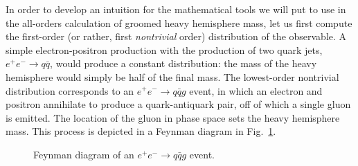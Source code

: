 \documentclass[../thesis.tex]{subfiles}
\begin{document}
	In order to develop an intuition for the mathematical tools we will put to use in the all-orders calculation of groomed heavy hemisphere mass, let us first compute the first-order (or rather, first \textit{nontrivial} order) distribution of the observable. A simple electron-positron production with the production of two quark jets, $e^+ e^- \to q\bar q$, would produce a constant distribution: the mass of the heavy hemisphere would simply be half of the final mass. The lowest-order nontrivial distribution corresponds to an $e^+ e^- \to q\bar q g$ event, in which an electron and positron annihilate to produce a quark-antiquark pair, off of which a single gluon is emitted. The location of the gluon in phase space sets the heavy hemisphere mass. This process is depicted in a Feynman diagram in Fig.~\ref{leading-fig:first-order diagram}.

	\begin{figure}
	\begin{center}

		\caption{\label{leading-fig:first-order diagram}Feynman diagram of an $e^+ e^- \to q\bar q g$ event.}
	\end{center}
	\end{figure}
\end{document}
